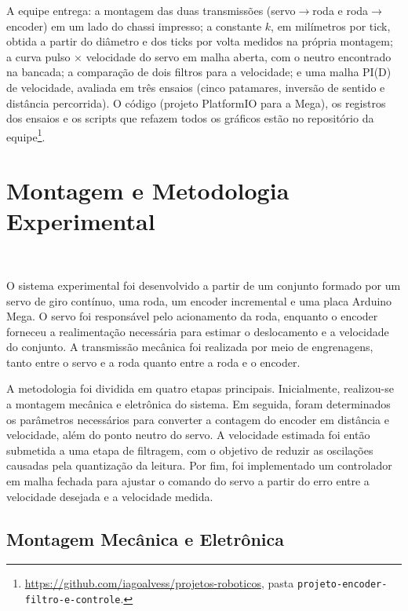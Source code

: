\documentclass[12pt]{article}
\begin{document}
A equipe entrega: a montagem das duas transmissões (servo$\to$roda e roda$\to$encoder) em um lado do chassi impresso; a constante $k$, em milímetros por tick, obtida a partir do diâmetro e dos ticks por volta medidos na própria montagem; a curva pulso $\times$ velocidade do servo em malha aberta, com o neutro encontrado na bancada; a comparação de dois filtros para a velocidade; e uma malha PI(D) de velocidade, avaliada em três ensaios (cinco patamares, inversão de sentido e distância percorrida). O código (projeto PlatformIO para a Mega), os registros dos ensaios e os scripts que refazem todos os gráficos estão no repositório da equipe\footnote{\url{https://github.com/iagoalvess/projetos-roboticos}, pasta \texttt{projeto-encoder-filtro-e-controle}.}.

\section{Montagem e Metodologia Experimental}\

O sistema experimental foi desenvolvido a partir de um conjunto formado por um servo de giro contínuo, uma roda, um encoder incremental e uma placa Arduino Mega. O servo foi responsável pelo acionamento da roda, enquanto o encoder forneceu a realimentação necessária para estimar o deslocamento e a velocidade do conjunto. A transmissão mecânica foi realizada por meio de engrenagens, tanto entre o servo e a roda quanto entre a roda e o encoder.

A metodologia foi dividida em quatro etapas principais. Inicialmente, realizou-se a montagem mecânica e eletrônica do sistema. Em seguida, foram determinados os parâmetros necessários para converter a contagem do encoder em distância e velocidade, além do ponto neutro do servo. A velocidade estimada foi então submetida a uma etapa de filtragem, com o objetivo de reduzir as oscilações causadas pela quantização da leitura. Por fim, foi implementado um controlador em malha fechada para ajustar o comando do servo a partir do erro entre a velocidade desejada e a velocidade medida.

\subsection{Montagem Mecânica e Eletrônica}\label{sec:montagem}
\end{document}
